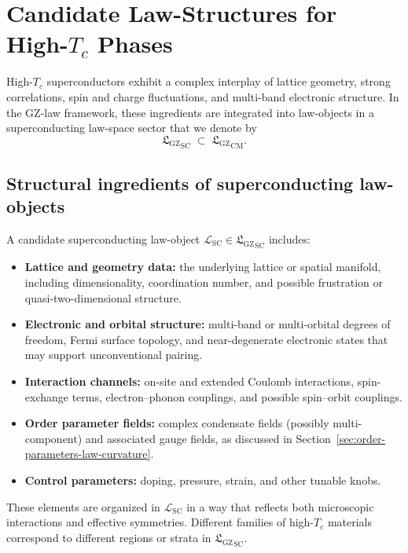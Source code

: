 \documentclass[11pt]{book}
\newcommand{\GZLS}{\ensuremath{\mathfrak{L}_{\mathrm{GZ}}}}
\theoremstyle{plain}
\theoremstyle{definition}
\theoremstyle{remark}
\begin{document}
\section{Candidate Law-Structures for High-\texorpdfstring{$T_c$}{T\_c} Phases}
\label{sec:candidate-law-structures-htc}


High-$T_c$ superconductors exhibit a complex interplay of lattice
geometry, strong correlations, spin and charge fluctuations, and
multi-band electronic structure. In the GZ-law framework, these
ingredients are integrated into law-objects in a superconducting
law-space sector that we denote by
\[
   {\GZLS}_{\mathrm{SC}} \;\subset\; {\GZLS}_{\mathrm{CM}}.
\]

\subsection*{Structural ingredients of superconducting law-objects}

A candidate superconducting law-object
$\mathcal{L}_{\mathrm{SC}} \in {\GZLS}_{\mathrm{SC}}$ includes:
\begin{itemize}
  \item \textbf{Lattice and geometry data:}
        the underlying lattice or spatial manifold, including
        dimensionality, coordination number, and possible
        frustration or quasi-two-dimensional structure.
  \item \textbf{Electronic and orbital structure:}
        multi-band or multi-orbital degrees of freedom, Fermi
        surface topology, and near-degenerate electronic states
        that may support unconventional pairing.
  \item \textbf{Interaction channels:}
        on-site and extended Coulomb interactions, spin-exchange
        terms, electron–phonon couplings, and possible spin–orbit
        couplings.
  \item \textbf{Order parameter fields:}
        complex condensate fields (possibly multi-component) and
        associated gauge fields, as discussed in
        Section~\ref{sec:order-parameters-law-curvature}.
  \item \textbf{Control parameters:}
        doping, pressure, strain, and other tunable knobs.
\end{itemize}

These elements are organized in $\mathcal{L}_{\mathrm{SC}}$ in a
way that reflects both microscopic interactions and effective
symmetries. Different families of high-$T_c$ materials correspond
to different regions or strata in ${\GZLS}_{\mathrm{SC}}$.
\end{document}
